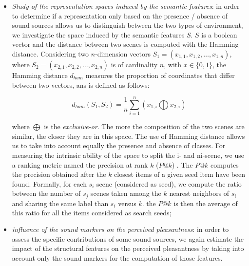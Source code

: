 \documentclass[preprint,12pt]{elsarticle}
\newcommand{\ml}[1]{\textcolor{red}{#1}}
\newcommand{\jfp}[1]{\textcolor{blue}{JFP : #1}}
\begin{document}
\begin{itemize}
where $c$ is the number of available classes, $c_k$ the number of classes for a given type of environment $k$, $c_j$ the number of  $j$ classes, and $c_{jk}$ the number of $j$ classes used for an environment $k$. \jfp{il faudrait donner une référence pour ce test : bouquin Lebart, Morineau, Piron, STATISTIQUE EXPLORATOIRE MULTIDIMENSIONNELLE
peut être donner les bornes de variations de Vjk pour aider le lecteur à comprendre cet indicateur} \ml{y pas une ref en Anglais ?} The V-test tests the null hypothesis that the ratio $\frac{c_{jk}}{c}$ is not significatively different from the ratio $\frac{c_{jk}}{c_k}$. For a given environment $k$, and class $j$, if the hypothesis is rejected, the class $j$ is said to be typical with respect to environment $k$. The typical classes are called \textbf{sound markers};\jfp{on ne comprend pas bien l'hypothèse alternative du test. VOIR BOUQUIN LEBART page 184 ou bien article de Morineau sur le sujet Vjk est une estimation approchée de la valeur test}

\item \emph{Study of the representation spaces induced by the semantic features}: in order to determine if a representation only based on the presence / absence of sound sources allows us to distinguish between the two types of environment, we investigate the space induced by the semantic features $S$. $S$ is a boolean vector and the distance between two scenes is computed with the Hamming distance. Considering two $n$-dimension vectors $S_1=(x_{1,1},x_{1,2},\ldots,x_{1,n})$, where $S_2=(x_{2,1},x_{2,2},\ldots,x_{2,n})$ is of cardinality $n$, with $x \in\lbrace 0,1\rbrace$, the Hamming distance $d_{ham}$ measures the proportion of coordinates that differ between two vectors, ans is defined as follows:

\begin{equation}
d_{ham}(S_1,S_2)=\dfrac{1}{n}\sum_{i=1}^{n} (x_{1,i} \bigoplus x_{2,i})
\end{equation}

where $\bigoplus$ is the \emph{exclusive-or}. The more the composition of the two scenes are similar, the closer they are in this space. The use of Hamming distance allows us to take into account equally the presence and absence of classes. For measuring the intrinsic ability of the space to split the i- and ni-scene, we use a ranking metric named the precision at rank $k$ ($P@k$) . The $P@k$ computes the precision obtained after the $k$ closest items of a given seed item have been found. Formally, for each $s_i$ scene (considered as seed), we compute the ratio between the number of $s_j$ scenes taken among the $k$ nearest neighbors of $s_i$ and sharing the same label than $s_i$ versus $k$. the $P@k$ is then the average of this ratio for all the items considered as search seeds;

\item \emph{influence of the sound markers on the perceived pleasantness}: in order to assess the specific contributions of some sound sources, we again estimate the impact of the structural features on the perceived pleasantness by taking into account only the sound markers for the computation of those features.
\end{itemize}
\end{document}
